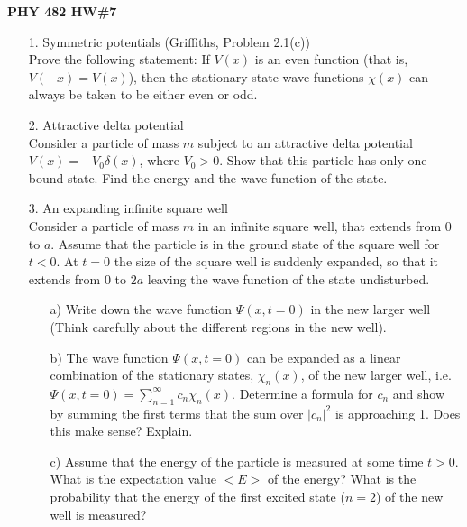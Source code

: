 \documentclass[11pt]{article}
\begin{document}
\thispagestyle{empty}

\centerline{\bf PHY 482 HW\#7}

\begin{itemize}
%
\item[1.] Symmetric potentials (Griffiths, Problem 2.1(c))\\
Prove the following statement: If $V(x)$ is an even function (that is, $V(-x)=V(x)$), then the stationary state
wave functions $\chi(x)$ can always be taken to be either even or odd.
%
\vspace*{0.5cm}
%
%
%
\item[2.] Attractive delta potential\\
Consider a particle of mass $m$ subject to an attractive delta potential $V(x) = -V_0 \delta(x)$, where $V_0 > 0$.
Show that this particle has only one bound state. Find the energy and the wave function of the state.
%
\vspace*{0.5cm}
%
\item[3.] An expanding infinite square well\\
Consider a particle of mass $m$ in an infinite square well, that extends from 0 to $a$. Assume that the particle is in the ground state of the square well for $t<0$. At $t=0$ the size of the square well is suddenly expanded, so that it extends
from 0 to $2a$ leaving the wave function of the state undisturbed.
\begin{itemize}
\item[a)]
Write down the wave function $\Psi(x,t=0)$ in the new larger well (Think carefully about the different regions in the new well).
\item[b)]
The wave function $\Psi(x,t=0)$ can be expanded as a linear combination of the stationary states, $\chi_n(x)$, of the new larger well, i.e. $\Psi(x,t=0) = \sum\limits_{n=1}^\infty c_n \chi_n(x)$. Determine a formula for $c_n$ and show by summing the first terms that the sum over $|c_n|^2$ is approaching 1. Does this make sense? Explain.
\item[c)]
Assume that the energy of the particle is measured at some time $t > 0$. What is the expectation value $<E>$ of the energy? What is the probability that the energy of the first excited state ($n=2$) of the new well is measured?

\end{itemize}
\end{itemize}
\end{document}
